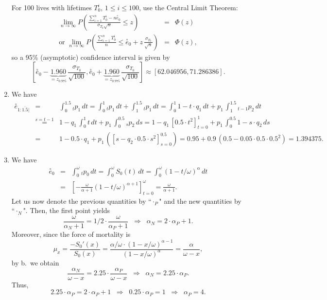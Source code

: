 \documentclass[11pt,fleqn,oneside]{book}
\begin{document}
\begin{enumerate}
For 100 lives with lifetimes $T^i_0$, $1\leq i \leq 100$, use the Central Limit Theorem:
\begin{eqnarray*}
\lim_{n\rightarrow \infty} P\left( \frac{\sum_{i=1}^n T^i_0 - n \stackrel{\circ}{e}_{0} }{\sigma_{T_0} \sqrt{n}} \leq z\right) &=& \Phi(z)\\
\text{or }
\lim_{n\rightarrow \infty} P\left( \frac{\sum_{i=1}^n T^i_0}{n} \leq \stackrel{\circ}{e}_{0} 
+ z \, \frac{\sigma_{T_0}}{\sqrt{n}} \right) &=& \Phi(z),
\end{eqnarray*}
so a 95\% (asymptotic) confidence interval is given by
$$
\left[\stackrel{\circ}{e}_{0} - \underbrace{1.960}_{=z_{0.975}} \, \frac{\sigma_{T_0}}{\sqrt{100}},\stackrel{\circ}{e}_{0} + \underbrace{1.960}_{=z_{0.975}} \, \frac{\sigma_{T_0}}{\sqrt{100}} \right] \approx [62.046956,71.286386].
$$

\item We have
\begin{eqnarray*}
\stackrel{\circ}{e}_{1:\overline{1.5}|} &=& \int_0^{1.5} {_tp_1}\,dt = \int_0^{1} {_tp_1}\,dt + \int_1^{1.5} {_tp_1}\,dt =  \int_0^{1} 1- t\cdot {q_1}\,dt + {p_1}\,\int_1^{1.5} {_{t-1}p_2}\,dt \\
&\stackrel{s=t-1}{=}&  1- {q_1}\, \int_0^{1} t\,dt + {p_1}\,\int_0^{0.5} {_{s}p_2}\,ds  = 1 - {q_1}\, \left[0.5\cdot t^2\right]_{t=0}^1 + {p_1}\, \int_0^{0.5} 1 - s\cdot {q_2}\,ds\\
&=& 1 -  0.5\cdot q_1 + {p_1}\,\left(\left[s - {q_2}\cdot 0.5\cdot s^2\right]_{s=0}^{0.5}\right) =
0.95 + 0.9\,\left(0.5 - 0.05\cdot 0.5 \cdot 0.5^2\right) = 1.394375.
\end{eqnarray*}
\item We have
\begin{eqnarray*}
\stackrel{\circ}{e}_0 &=& \int_0^{\omega} {_tp_0}\,dt = \int_0^{\omega} S_0(t)\,dt = \int_0^{\omega} (1-t/\omega)^{\alpha}\,dt \\
&=& \left[-\frac{\omega}{\alpha+1} \left(1 - t/\omega\right)^{\alpha+1}\right]_{t=0}^{\omega} = \frac{\omega}{\alpha+1}.
\end{eqnarray*}
Let us now denote the previous quantities by ``$\cdot_P$" and the new quantities by ``$\cdot_N$". Then, the first point yields
$$
\frac{\omega}{\alpha_N + 1} = 1/2 \cdot \frac{\omega}{\alpha_P + 1} \;\; \Rightarrow \;\; \alpha_N = 2\cdot \alpha_P + 1.
$$
Moreover, since the force of mortality is
$$
\mu_x = \frac{-S_0'(x)}{S_0(x)} = \frac{\alpha/\omega\cdot (1-x/\omega)^{\alpha-1}}{(1-x/\omega)^\alpha} = \frac{\alpha}{\omega - x},
$$
by b.\ we obtain
$$
\frac{\alpha_N}{\omega- x} = 2.25\cdot \frac{\alpha_P}{\omega- x} \;\; \Rightarrow \;\; \alpha_N = 2.25 \cdot \alpha_P.
$$
Thus,
$$
2.25 \cdot \alpha_P = 2\cdot \alpha_P + 1 \;\; \Rightarrow \;\; 0.25\cdot \alpha_P = 1 \;\; \Rightarrow \;\; \alpha_P = 4. 
$$


\end{enumerate}
\end{document}
